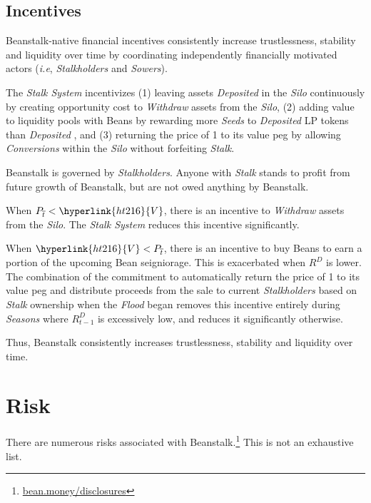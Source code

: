\documentclass[tikz]{article}
\newcommand{\term}[1]{\textsl{#1}}
\newcommand{\fref}[1]{\footnote{\href{http://#1}{#1}}}
\newcommand{\Bean}{} %
\begin{document}
\vspace*{-1.3mm}
\subsection{Incentives}
\vspace*{-1.3mm}

Beanstalk-native financial incentives consistently increase trustlessness, stability and liquidity over time by coordinating independently financially motivated actors (\term{i.e}, \term{Stalkholders} and \term{Sowers}). 

The \term{Stalk System} incentivizes (1) leaving assets \term{Deposited} in the \term{Silo} continuously by creating opportunity cost to \term{Withdraw} assets from the \term{Silo}, (2) adding value to liquidity pools with Beans by rewarding more \term{Seeds} to \term{Deposited} LP tokens than \term{Deposited} \Bean, and (3) returning the price of \Bean1 to its value peg by allowing \term{Conversions} within the \term{Silo} without forfeiting \term{Stalk}.

Beanstalk is governed by \term{Stalkholders}. Anyone with \term{Stalk} stands to profit from future growth of Beanstalk, but are not owed anything by Beanstalk. 

When $P_{\overline{t}} < \hyperlink{ht216}{V}$, there is an incentive to \term{Withdraw} assets from the \term{Silo}. The \term{Stalk System} reduces this incentive significantly.

When $\hyperlink{ht216}{V} < P_{\overline{t}}$, there is an incentive to buy Beans to earn a portion of the upcoming Bean seigniorage. This is exacerbated when \hyperlink{ht156}{$R^D$} is lower. The combination of the commitment to automatically return the price of \Bean1 to its value peg and distribute proceeds from the sale to current \term{Stalkholders} based on \term{Stalk} ownership when the \term{Flood} began removes this incentive entirely during \term{Seasons} where \hyperlink{ht157}{$R^D_{t-1}$} is excessively low, and reduces it significantly otherwise.

Thus, Beanstalk consistently increases trustlessness, stability and liquidity over time.

\section{Risk}

There are numerous risks associated with Beanstalk.\fref{bean.money/disclosures} This is not an exhaustive list.
\end{document}
